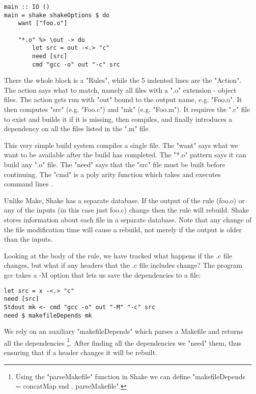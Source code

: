 \begin{lstlisting}
main :: IO ()
main = shake shakeOptions $ do
    want ["foo.o"]

    "*.o" %> \out -> do
        let src = out -<.> "c"
        need [src]
        cmd "gcc -o" out "-c" src
\end{lstlisting}

There the whole block is a \lst"Rules", while the 5 indented lines are the \lst"Action". The action says what to match, namely all files with a \lst".o" extension - object files. The action gets run with \lst"out" bound to the output name, e.g. \lst"Foo.o". It then computes \lst"src" (e.g. \lst"Foo.c") and \lst"mk" (e.g. \lst"Foo.m"). It requires the \lst".c" file to exist and builds it if it is missing, then compiles, and finally introduces a dependency on all the files listed in the \lst".m" file.

This very simple build system compiles a single file. The \lst"want" says what we want to be available after the build has completed. The \lst"*.o" pattern says it can build any \lst".o" file. The \lst"need" says that the \lst"src" file must be built before continuing. The \lst"cmd" is a poly arity function which takes and executes command lines \cite{poly_arity}.

Unlike Make, Shake has a separate database. If the output of the rule (foo.o) or any of the inputs (in this case just foo.c) change then the rule will rebuild. Shake stores information about each file in a separate database. Note that any change of the file modification time will cause a rebuild, not merely if the output is older than the inputs.

Looking at the body of the rule, we have tracked what happens if the .c file changes, but what if any headers that the .c file includes change? The program gcc takes a -M option that lets us save the dependencies to a file:

\begin{lstlisting}
let src = x -<.> "c"
need [src]
Stdout mk <- cmd "gcc -o" out "-M" "-c" src
need $ makefileDepends mk
\end{lstlisting}

We rely on an auxiliary \lst"makefileDepends" which parses a Makefile and returns all the dependencies \footnote{Using the \lst"parseMakefile" function in Shake we can define \lst"makefileDepends = concatMap snd . parseMakefile".}. After finding all the dependencies we \lst"need" them, thus ensuring that if a header changes it will be rebuilt.

